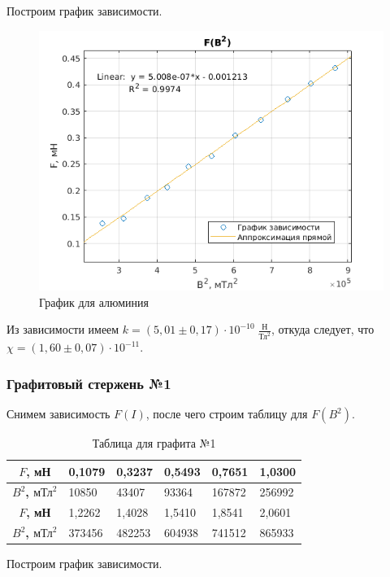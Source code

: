 Построим график зависимости.

\begin{figure}[h]
    \centering
    \includegraphics[width = 12 cm]{images/al.png}
    \caption{График для алюминия}
    \label{al}
\end{figure}

Из зависимости имеем $k = (5,01 \pm 0,17) \cdot 10^{-10} \; \frac{\text{Н}}{\text{Тл}^2}$, откуда следует, что $\chi = (1,60 \pm 0,07) \cdot 10^{-11}$. 

\subsubsection{Графитовый стержень №1}

Снимем зависимость $F(I)$, после чего строим таблицу для $F(B^2)$.

\begin{table}[]
    \centering
    \begin{tabular}{|c|l|l|l|l|l|}
    \hline
    \textbf{$F$, мН}               & 0,1079 & 0,3237 & 0,5493 & 0,7651 & 1,0300 \\ \hline
    \textbf{$B^2$, $\text{мТл}^2$} & 10850  & 43407  & 93364  & 167872 & 256992 \\ \hline
    \textbf{$F$, мН}               & 1,2262 & 1,4028 & 1,5410 & 1,8541 & 2,0601 \\ \hline
    \textbf{$B^2$, $\text{мТл}^2$} & 373456 & 482253 & 604938 & 741512 & 865933 \\ \hline
    \end{tabular}
    \caption{Таблица для графита №1}
\end{table}

Построим график зависимости.

